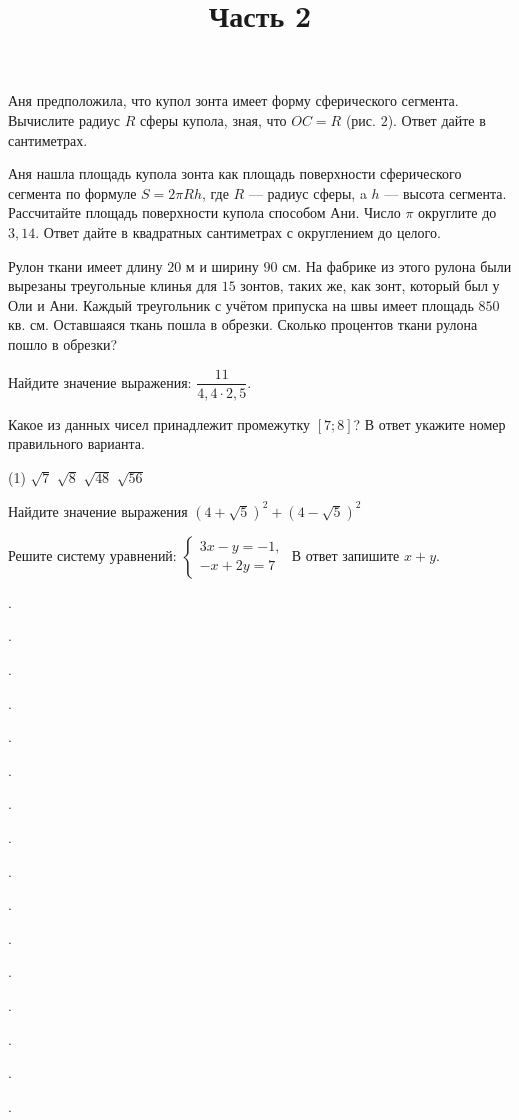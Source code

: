 \begin{training}[2]
\begin{listofex}
		\newpage
		\hphantom{Часть 1}
		\item Аня предположила, что купол зонта имеет форму сферического сегмента. Вычислите радиус \( R \) сферы купола, зная, что \( OC=R \) (рис. \( 2 \)). Ответ дайте в сантиметрах.
		\foranswer
		\item Аня нашла площадь купола зонта как площадь поверхности сферического сегмента по формуле \( S=2\pi Rh \), где \( R \) --- радиус сферы, a \( h \) --- высота сегмента. Рассчитайте площадь поверхности купола способом Ани. Число \( \pi \)  округлите до \( 3,14 \). Ответ дайте в квадратных сантиметрах с округлением до целого.
		\foranswer
		\item Рулон ткани имеет длину \( 20 \) м и ширину \( 90 \) см. На фабрике из этого рулона были вырезаны треугольные клинья для \( 15 \) зонтов, таких же, как зонт, который был у Оли и Ани. Каждый треугольник с учётом припуска на швы имеет площадь \( 850 \) кв. см. Оставшаяся ткань пошла в обрезки. Сколько процентов ткани рулона пошло в обрезки?
		\foranswer
		\item Найдите значение выражения: \( \dfrac{11}{4,4\cdot2,5} \).
		\foranswer
		\item Какое из данных чисел принадлежит промежутку \( [7;8] \)? В ответ укажите номер правильного варианта.
		\begin{tasks}(1)
			\task \( \sqrt{7} \)
			\task \( \sqrt{8} \)
			\task \( \sqrt{48} \)
			\task \( \sqrt{56} \)
		\end{tasks}
		\foranswer
		\item Найдите значение выражения \( (4+\sqrt{5})^2+(4-\sqrt{5})^2 \)
		\foranswer
		\newpage
		\hphantom{Часть 1}
		\item Решите систему уравнений: \( \left\{
		\begin{array}{l}
			3x-y=-1,\\
			-x+2y=7
		\end{array}
		\right. \) В ответ запишите \( x+y \).
		\foranswer
		\item .
		\foranswer
		\item .
		\foranswer
		\item .
		\foranswer
		\item .
		\foranswer
		\item .
		\foranswer
		\item .
		\foranswer
		\item .
		\foranswer
		\item .
		\foranswer
		\item .
		\foranswer
		\item .
		\foranswer
		\title{Часть 2}
		\item .
		\item .
		\item .
		\item .
		\item .
		\item .
	\end{listofex}
\end{training}
